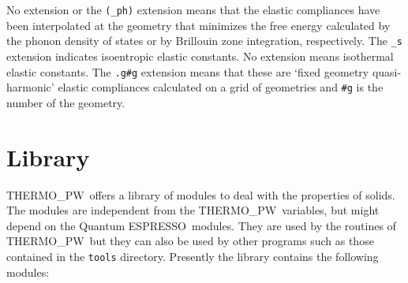 \documentclass[12pt,a4paper]{article}
\def\qe{{\sc Quantum ESPRESSO}}
\def\tpw{{\sc THERMO\_PW}}
\begin{document}
No extension or the \texttt{(\_ph)} extension means that the elastic
compliances have been interpolated at the geometry that minimizes the
free energy calculated by the phonon density of states or by Brillouin
zone integration, respectively. 
The \texttt{\_s} extension indicates isoentropic elastic constants.
No extension means isothermal elastic constants.
The \texttt{.g\#g} extension means that these are `fixed geometry
quasi-harmonic' elastic compliances calculated on a grid of geometries
and \texttt{\#g} is the number of the geometry.

\newpage
\section{\color{coral}Library}

\tpw\ offers a library of modules to deal with the properties of solids. The 
modules are independent from the \tpw\ variables, but might
depend on the \qe\ modules. They are used by the routines of \tpw\ 
but they can also be used by other programs such as those contained
in the \texttt{tools} directory. Presently the library contains the
following modules:
\end{document}
